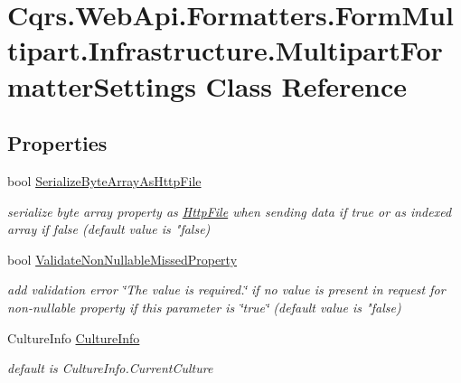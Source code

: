 \hypertarget{classCqrs_1_1WebApi_1_1Formatters_1_1FormMultipart_1_1Infrastructure_1_1MultipartFormatterSettings}{}\section{Cqrs.\+Web\+Api.\+Formatters.\+Form\+Multipart.\+Infrastructure.\+Multipart\+Formatter\+Settings Class Reference}
\label{classCqrs_1_1WebApi_1_1Formatters_1_1FormMultipart_1_1Infrastructure_1_1MultipartFormatterSettings}
\subsection*{Properties}
\begin{DoxyCompactItemize}
\item 
bool \hyperlink{classCqrs_1_1WebApi_1_1Formatters_1_1FormMultipart_1_1Infrastructure_1_1MultipartFormatterSettings_ada06553a43f83734ecef9d811993d048_ada06553a43f83734ecef9d811993d048}{Serialize\+Byte\+Array\+As\+Http\+File}
\begin{DoxyCompactList}\small\item\em serialize byte array property as \hyperlink{classCqrs_1_1WebApi_1_1Formatters_1_1FormMultipart_1_1Infrastructure_1_1HttpFile}{Http\+File} when sending data if true or as indexed array if false (default value is "false) \end{DoxyCompactList}\item 
bool \hyperlink{classCqrs_1_1WebApi_1_1Formatters_1_1FormMultipart_1_1Infrastructure_1_1MultipartFormatterSettings_a8db49349b200f3aea3fc9642ca1f9fd9_a8db49349b200f3aea3fc9642ca1f9fd9}{Validate\+Non\+Nullable\+Missed\+Property}
\begin{DoxyCompactList}\small\item\em add validation error \char`\"{}\+The value is required.\char`\"{} if no value is present in request for non-\/nullable property if this parameter is \char`\"{}true\char`\"{} (default value is "false) \end{DoxyCompactList}\item 
Culture\+Info \hyperlink{classCqrs_1_1WebApi_1_1Formatters_1_1FormMultipart_1_1Infrastructure_1_1MultipartFormatterSettings_a3ee49282a37f9e6f39e5e0e8558e4e5e_a3ee49282a37f9e6f39e5e0e8558e4e5e}{Culture\+Info}
\begin{DoxyCompactList}\small\item\em default is Culture\+Info.\+Current\+Culture \end{DoxyCompactList}\end{DoxyCompactItemize}


